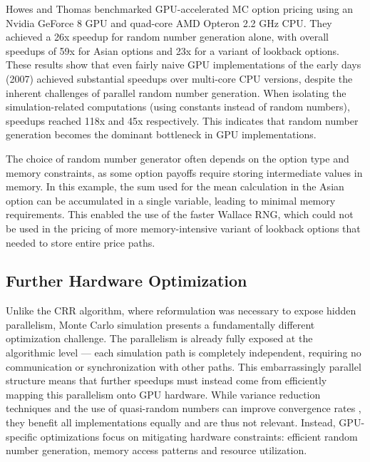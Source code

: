 \documentclass[english,12pt,a4paper,pdftex,sci,utf8]{aaltothesis}
\begin{document}
Howes and Thomas \cite{nguyen2007gpu} benchmarked GPU-accelerated MC option pricing using an Nvidia GeForce 8 GPU and quad-core AMD Opteron 2.2 GHz CPU. They achieved a 26x speedup for random number generation alone, with overall speedups of 59x for Asian options and 23x for a variant of lookback options. These results show that even fairly naive GPU implementations of the early days (2007) achieved substantial speedups over multi-core CPU versions, despite the inherent challenges of parallel random number generation. When isolating the simulation-related computations (using constants instead of random numbers), speedups reached 118x and 45x respectively. This indicates that random number generation becomes the dominant bottleneck in GPU implementations. 

The choice of random number generator often depends on the option type and memory constraints, as some option payoffs require storing intermediate values in memory. In this example, the sum used for the mean calculation in the Asian option can be accumulated in a single variable, leading to minimal memory requirements. This enabled the use of the faster Wallace RNG, which could not be used in the pricing of more memory-intensive variant of lookback options that needed to store entire price paths.

\subsection{Further Hardware Optimization}
Unlike the CRR algorithm, where reformulation was necessary to expose hidden parallelism, Monte Carlo simulation presents a fundamentally different optimization challenge. The parallelism is already fully exposed at the algorithmic level --- each simulation path is completely independent, requiring no communication or synchronization with other paths. This embarrassingly parallel structure means that further speedups must instead come from efficiently mapping this parallelism onto GPU hardware. While variance reduction techniques and the use of quasi-random numbers can improve convergence rates \cite{clewlow1998implementing}, they benefit all implementations equally and are thus not relevant. Instead, GPU-specific optimizations focus on mitigating hardware constraints: efficient random number generation, memory access patterns and resource utilization. 
\end{document}
